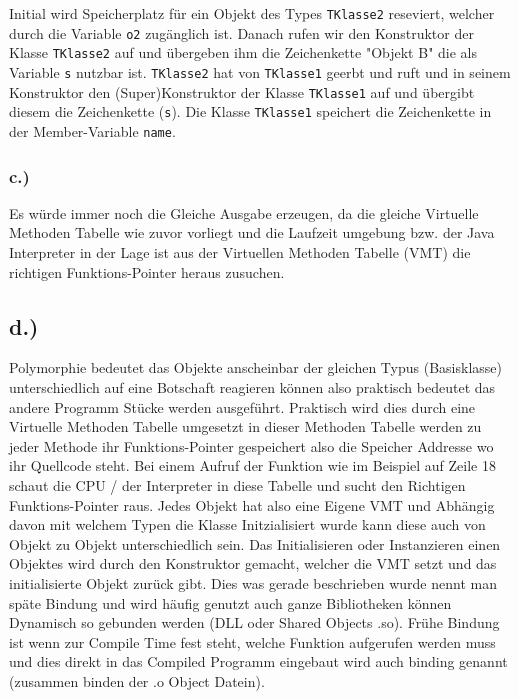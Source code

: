 \documentclass[12pt]{article}
\begin{document}
Initial wird Speicherplatz für ein Objekt des Types \verb|TKlasse2| reseviert, welcher durch die Variable \verb|o2| zugänglich ist. Danach rufen wir den Konstruktor der Klasse \verb|TKlasse2| auf und übergeben ihm die Zeichenkette "Objekt B" die als Variable \verb|s| nutzbar ist. \verb|TKlasse2| hat von \verb|TKlasse1| geerbt und ruft und in seinem Konstruktor den (Super)Konstruktor der Klasse \verb|TKlasse1| auf und übergibt diesem die Zeichenkette (\verb|s|). Die Klasse \verb|TKlasse1| speichert die Zeichenkette in der Member-Variable \verb|name|. 

\subsubsection*{c.)}
Es würde immer noch die Gleiche Ausgabe erzeugen, da die gleiche Virtuelle Methoden Tabelle wie zuvor vorliegt und die Laufzeit umgebung bzw. der Java Interpreter in der Lage ist aus der Virtuellen Methoden Tabelle (VMT) die richtigen Funktions-Pointer heraus zusuchen.

\subsection*{d.)}
Polymorphie bedeutet das Objekte anscheinbar der gleichen Typus (Basisklasse) unterschiedlich auf eine Botschaft reagieren können also praktisch bedeutet das andere Programm Stücke werden ausgeführt. Praktisch wird dies durch eine Virtuelle Methoden Tabelle umgesetzt in dieser Methoden Tabelle werden zu jeder Methode ihr Funktions-Pointer gespeichert also die Speicher Addresse wo ihr Quellcode steht. Bei einem Aufruf der Funktion wie im Beispiel auf Zeile 18 schaut die CPU / der Interpreter in diese Tabelle und sucht den Richtigen Funktions-Pointer raus. Jedes Objekt hat also eine Eigene VMT und Abhängig davon mit welchem Typen die Klasse Initzialisiert wurde kann diese auch von Objekt zu Objekt unterschiedlich sein. Das Initialisieren oder Instanzieren einen Objektes wird durch den Konstruktor gemacht, welcher die VMT setzt und das initialisierte Objekt zurück gibt. Dies was gerade beschrieben wurde nennt man späte Bindung und wird häufig genutzt auch ganze Bibliotheken können Dynamisch so gebunden werden (DLL oder Shared Objects .so). Frühe Bindung ist wenn zur Compile Time fest steht, welche Funktion aufgerufen werden muss und dies direkt in das Compiled Programm eingebaut wird auch binding genannt (zusammen binden der .o Object Datein).
\end{document}
